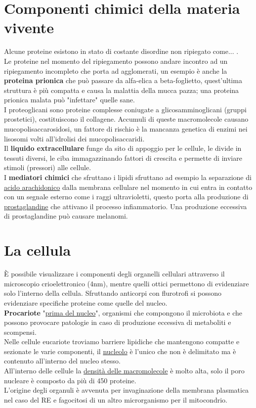 \documentclass[10pt]{article}
\begin{document}
\section*{Componenti chimici della materia vivente}
Alcune proteine esistono in stato di costante disordine non ripiegato come... .\\
Le proteine nel momento del ripiegamento possono andare incontro ad un ripiegamento incompleto che porta ad agglomerati, un esempio è anche la \textbf{proteina prionica} che può passare da alfa-elica a beta-foglietto, quest'ultima struttura è più compatta e causa la malattia della mucca pazza; una proteina prionica malata può "infettare" quelle sane.\\
I proteoglicani sono proteine complesse coniugate a glicosamminoglicani (gruppi prostetici), costituiscono il collagene. Accumuli di queste macromolecole causano mucopolisaccarosidosi, un fattore di rischio è la mancanza genetica di enzimi nei lisosomi volti all'idrolisi dei mucopolisaccaridi.\\ 
Il \textbf{liquido extracellulare} funge da sito di appoggio per le cellule, le divide in tessuti diversi, le ciba immagazzinando fattori di crescita e permette di inviare stimoli (pressori) alle cellule. \\
I \textbf{mediatori chimici} che sfruttano i lipidi sfruttano ad esempio la separazione di \underline{acido arachidonico} dalla membrana cellulare nel momento in cui entra in contatto con un segnale esterno come i raggi ultravioletti, questo porta alla produzione di \underline{prostaglandine} che attivano il processo infiammatorio. Una produzione eccessiva di prostaglandine può causare melanomi. \\
\section*{La cellula}
È possibile visualizzare i componenti degli organelli cellulari attraverso il microscopio crioelettronico (4nm), mentre quelli ottici permettono di evidenziare solo l'interno della cellula. Sfruttando anticorpi con flurotrofi si possono evidenziare specifiche proteine come quelle del nucleo.\\
\textbf{Procariote} "\underline{prima del nucleo}", organismi che compongono il microbiota e che possono provocare patologie in caso di produzione eccessiva di metaboliti e scompensi. \\
Nelle cellule eucariote troviamo barriere lipidiche che mantengono compatte e sezionate le varie componenti, il \underline{nucleolo} è l'unico che non è delimitato ma è contenuto all'interno del nucleo stesso.\\
All'interno delle cellule la \underline{densità delle macromolecole} è molto alta, solo il poro nucleare è composto da più di 450 proteine.\\
L'origine degli organuli è avvenuta per invaginazione della membrana plasmatica nel caso del RE e fagocitosi di un altro microrganismo per il mitocondrio.
\end{document}

